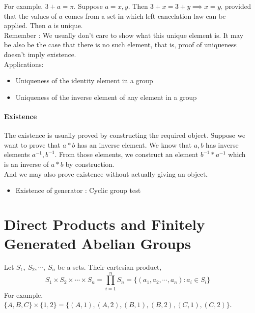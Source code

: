 	For example, $3 + a = \pi$. Suppose $a = x,y$. Then $3 + x = 3 + y \implies x = y$, provided that the values of $a$ comes from a set in which left cancelation law can be applied. Then $a$ is unique.\\

	Remember : We usually don't care to show what this unique element is. It may be also be the case that there is no such element, that is, proof of uniqueness doesn't imply existence.\\

	Applications:
\begin{itemize}
	\item Uniqueness of the identity element in a group
	\item Uniqueness of the inverse element of any element in a group
\end{itemize}

\paragraph{Existence}
	The existence is usually proved by constructing the required object. Suppose we want to prove that $a\ast b$ has an inverse element. We know that $a,b$ has inverse elements $a^{-1},b^{-1}$. From those elements, we construct an element $b^{-1} \ast a^{-1}$ which is an inverse of $a \ast b$ by construction.\\

	And we may also prove existence without actually giving an object. %

\begin{itemize}
	\item Existence of generator : Cyclic group test
\end{itemize}
\pagebreak

\section{Direct Products and Finitely Generated Abelian Groups}
\begin{definition}
	Let $S_1,\ S_2, \cdots,\ S_n$ be a sets.
	Their cartesian product,
	$$ S_1 \times S_2 \times \cdots \times S_n = \prod_{i = 1}^n S_n = \{ (a_1,a_2,\cdots,a_n) :  a_i \in S_i \} $$
	For example, $ \{A,B,C\} \times \{ 1,2 \} = \{ (A,1),(A,2),(B,1),(B,2),(C,1),(C,2) \}$.
\end{definition}

